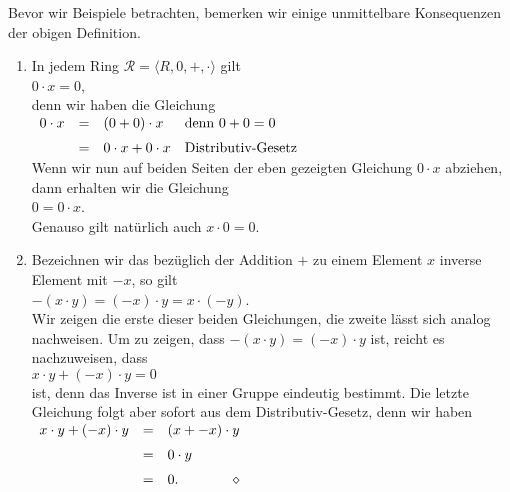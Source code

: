 \remark
Bevor wir Beispiele betrachten, bemerken wir einige unmittelbare Konsequenzen der obigen Definition.
\begin{enumerate}
\item In jedem Ring $\mathcal{R} = \langle R, 0, +, \cdot \rangle$ gilt
      \\[0.2cm]
      \hspace*{1.3cm}
      $0 \cdot x = 0$,
      \\[0.2cm]
      denn wir haben die Gleichung
      \\[0.2cm]
      \hspace*{1.3cm}
      $
      \begin{array}[t]{lcll}
        0 \cdot x & = & (0 + 0) \cdot x 
                      & \mbox{denn $0 + 0 = 0$} \\[0.2cm]
                  & = & 0 \cdot x + 0 \cdot x
                      & \mbox{Distributiv-Gesetz}
      \end{array}
      $
      \\[0.2cm]
      Wenn wir nun auf beiden Seiten der eben gezeigten Gleichung 
      $0 \cdot x$ abziehen, dann erhalten wir die Gleichung
      \\[0.2cm]
      \hspace*{1.3cm}
      $0 = 0 \cdot x$.
      \\[0.2cm]
      Genauso gilt nat\"{u}rlich auch $x \cdot 0 = 0$. 
\item Bezeichnen wir das bez\"{u}glich der Addition $+$ zu einem Element $x$ inverse Element mit $-x$,
      so gilt 
      \\[0.2cm]
      \hspace*{1.3cm}
      $-(x \cdot y) = (-x) \cdot y = x \cdot (-y)$.
      \\[0.2cm]
      Wir zeigen die erste dieser beiden Gleichungen, die zweite l\"{a}sst sich analog nachweisen.
      Um zu zeigen, dass $-(x \cdot y) = (-x) \cdot y$ ist, reicht es nachzuweisen, dass
      \\[0.2cm]
      \hspace*{1.3cm}
      $x \cdot y + (-x) \cdot y = 0$
      \\[0.2cm]
      ist, denn das Inverse ist in einer Gruppe eindeutig bestimmt.  Die letzte Gleichung folgt aber sofort
      aus dem Distributiv-Gesetz, denn wir haben
      \\[0.2cm]
      \hspace*{1.3cm}
      $
      \begin{array}[t]{lcl}
      x \cdot y + (-x) \cdot y & = & (x + - x) \cdot y \\[0.2cm]
                               & = & 0 \cdot y \\[0.2cm]
                               & = & 0. \hspace*{\fill} \diamond
      \end{array}
      $
\end{enumerate}


